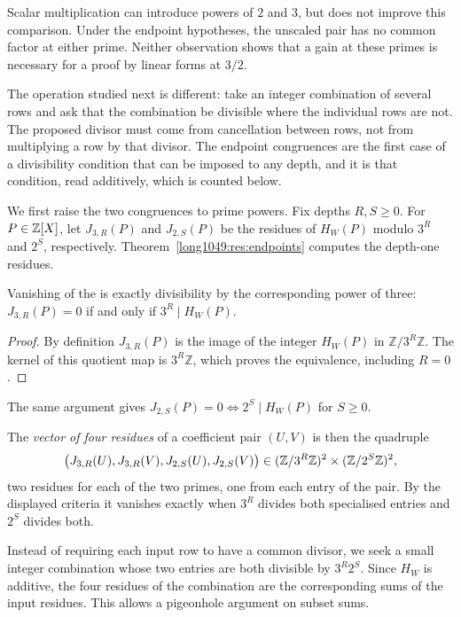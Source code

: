 \documentclass[11pt]{article}
\begin{document}
\noindent Scalar multiplication can introduce powers of $2$ and $3$,
but does not improve this comparison. Under the endpoint hypotheses,
the unscaled pair has no common factor at either prime. Neither
observation shows that a gain at these primes is necessary for a proof
by linear forms at $3/2$.

The operation studied next is different: take an integer combination
of several rows and ask that the combination be divisible where the
individual rows are not. The proposed divisor must come from
cancellation between rows, not from multiplying a row by that divisor.
The endpoint congruences are the first case of a divisibility condition that can be imposed
to any depth, and it is that condition, read additively, which is counted
below.

We first raise the two congruences to prime powers.  Fix depths \(R,S\ge0\).
For $P\in\mathbb{Z}[X]$, let $J_{3,R}(P)$ and $J_{2,S}(P)$ be the residues of
$H_W(P)$ modulo $3^R$ and $2^S$, respectively.
Theorem~\ref{long1049:res:endpoints} computes the depth-one residues.

\begin{lemma}\label{res:bottomjet}
Vanishing of the
is exactly divisibility by the corresponding power of three:
$J_{3,R}(P)=0$ if and only if $3^R\mid H_W(P)$.
\end{lemma}
\begin{proof}
By definition $J_{3,R}(P)$ is the image of the integer $H_W(P)$ in
$\mathbb Z/3^R\mathbb Z$. The kernel of this quotient map is
$3^R\mathbb Z$, which proves the equivalence, including $R=0$.
\end{proof}
The same argument gives
$J_{2,S}(P)=0\iff2^S\mid H_W(P)$ for $S\ge0$.

The \emph{vector of four residues} of a coefficient pair
\((U,V)\) is then the quadruple
\[
 \bigl(J_{3,R}(U),J_{3,R}(V),J_{2,S}(U),J_{2,S}(V)\bigr)
 \in(\mathbb{Z}/3^R\mathbb{Z})^2\times(\mathbb{Z}/2^S\mathbb{Z})^2 ,
\]
two residues for each of the two primes, one from each entry of the pair.  By
the displayed criteria it vanishes exactly when \(3^R\) divides both specialised
entries and \(2^S\) divides both.

Instead of requiring each input row to have a common divisor, we seek
a small integer combination whose two entries are both divisible by
$3^R2^S$. Since $H_W$ is additive, the four residues of the combination
are the corresponding sums of the input residues. This allows a
pigeonhole argument on subset sums.
\end{document}
